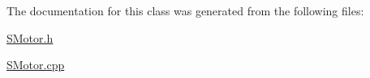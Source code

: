 The documentation for this class was generated from the following files\+:\begin{DoxyCompactItemize}
\item 
\hyperlink{_s_motor_8h}{S\+Motor.\+h}\item 
\hyperlink{_s_motor_8cpp}{S\+Motor.\+cpp}\end{DoxyCompactItemize}
